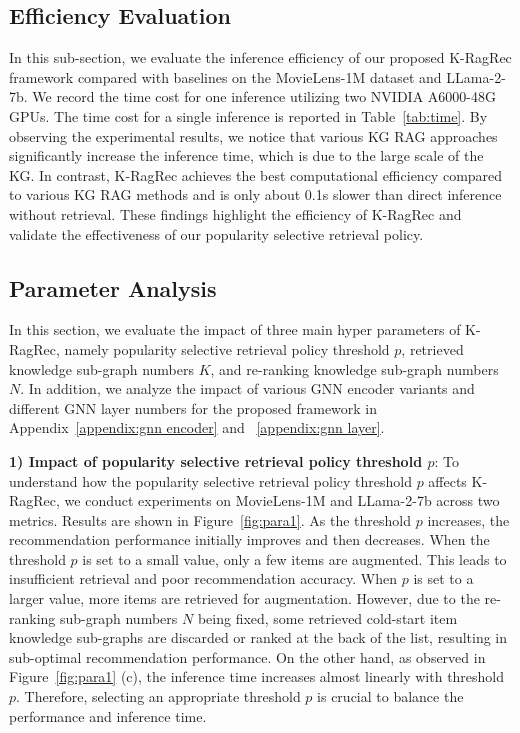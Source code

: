 \subsection{\textbf{Efficiency Evaluation}}
In this sub-section, we evaluate the inference efficiency of our proposed K-RagRec framework compared with baselines on the MovieLens-1M dataset and LLama-2-7b.
We record the time cost for one inference utilizing two NVIDIA A6000-48G GPUs. The time cost for a single inference is reported in Table~\ref{tab:time}.
By observing the experimental results, we notice that various KG RAG approaches significantly increase the inference time, which is due to the large scale of the KG. In contrast, K-RagRec achieves the best computational efficiency compared to various KG RAG methods and is only about 0.1s slower than direct inference without retrieval.
These findings highlight the efficiency of K-RagRec and validate the effectiveness of our popularity selective retrieval policy.





\subsection{\textbf{Parameter Analysis}}
In this section, we evaluate the impact of three main hyper parameters of K-RagRec, namely popularity selective retrieval policy threshold $p$, retrieved knowledge sub-graph numbers $K$,
and re-ranking knowledge sub-graph numbers $N$.
In addition, we analyze the impact of various GNN encoder variants and different GNN layer numbers for the proposed framework in Appendix~\ref{appendix:gnn encoder} and ~\ref{appendix:gnn layer}.

\textbf{1) Impact of popularity selective retrieval policy threshold $p$}:
To understand how the popularity selective retrieval policy threshold $p$ affects K-RagRec, we conduct experiments on MovieLens-1M and LLama-2-7b across two metrics. Results are shown in Figure~\ref{fig:para1}.
As the threshold $p$ increases, the recommendation performance initially improves and then decreases. When the threshold $p$ is set to a small value, only a few items are augmented. This leads to insufficient retrieval and poor recommendation accuracy. When $p$ is set to a larger value, more items are retrieved for augmentation. However, due to the re-ranking sub-graph numbers $N$ being fixed, some retrieved cold-start item knowledge sub-graphs are discarded or ranked at the back of the list, resulting in sub-optimal recommendation performance. 
On the other hand, as observed in Figure~\ref{fig:para1} (c), the inference time increases almost linearly with threshold $p$. Therefore, selecting an appropriate threshold $p$ is crucial to balance the performance and inference time.

